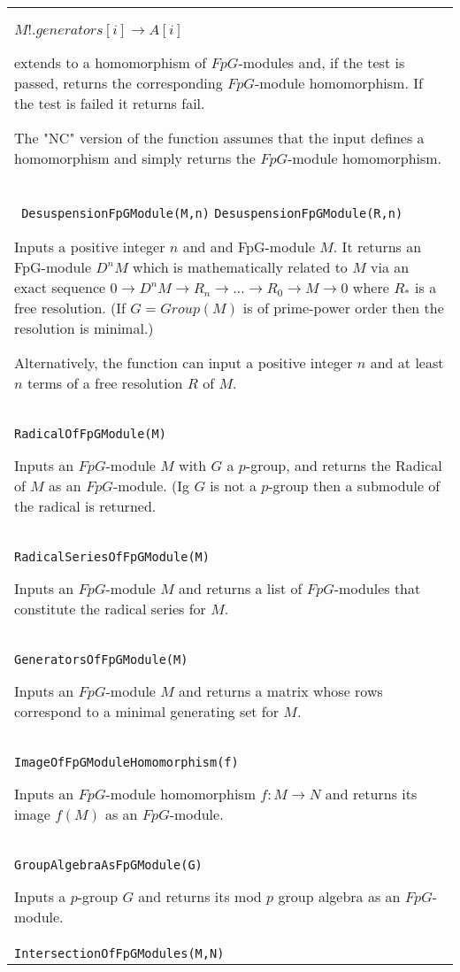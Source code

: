 \documentclass[a4paper,11pt]{report}
\begin{document}
{\begin{center}
\begin{tabular}{|l|}
 $ M!.generators[i] \longrightarrow A[i]$ 

 extends to a homomorphism of $FpG$-modules and, if the test is passed, returns the corresponding $FpG$-module homomorphism. If the test is failed it returns fail. 

 The "NC" version of the function assumes that the input defines a homomorphism
and simply returns the $FpG$-module homomorphism. \\
 \index{DesuspensionFpGModule} \texttt{ DesuspensionFpGModule(M,n)} \texttt{DesuspensionFpGModule(R,n) } 

 Inputs a positive integer $n$ and and FpG-module $M$. It returns an FpG-module $D^nM$ which is mathematically related to $M$ via an exact sequence $ 0 \longrightarrow D^nM \longrightarrow R_n \longrightarrow \ldots
\longrightarrow R_0 \longrightarrow M \longrightarrow 0$ where $R_\ast$ is a free resolution. (If $G=Group(M)$ is of prime-power order then the resolution is minimal.) 

 Alternatively, the function can input a positive integer $n$ and at least $n$ terms of a free resolution $R$ of $M$. \\
 \index{RadicalOfFpGModule} \texttt{RadicalOfFpGModule(M) } 

 Inputs an $FpG$-module $M$ with $G$ a $p$-group, and returns the Radical of $M$ as an $FpG$-module. (Ig $G$ is not a $p$-group then a submodule of the radical is returned. \\
 \index{RadicalSeriesOfFpGModule} \texttt{RadicalSeriesOfFpGModule(M) } 

 Inputs an $FpG$-module $M$ and returns a list of $FpG$-modules that constitute the radical series for $M$. \\
 \index{GeneratorsOfFpGModule} \texttt{GeneratorsOfFpGModule(M) } 

 Inputs an $FpG$-module $M$ and returns a matrix whose rows correspond to a minimal generating set for $M$. \\
 \index{ImageOfFpGModuleHomomorphism} \texttt{ImageOfFpGModuleHomomorphism(f) } 

 Inputs an $FpG$-module homomorphism $f:M \longrightarrow N$ and returns its image $f(M)$ as an $FpG$-module. \\
 \index{GroupAlgebraAsFpGModule} \texttt{GroupAlgebraAsFpGModule(G) } 

 Inputs a $p$-group $G$ and returns its mod $p$ group algebra as an $FpG$-module. \\
 \index{IntersectionOfFpGModules} \texttt{IntersectionOfFpGModules(M,N) } 


\end{tabular}
\end{center}}
\end{document}
